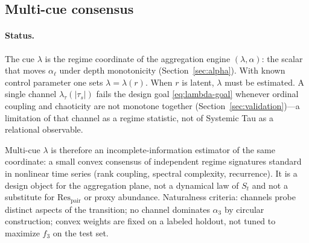 \documentclass[11pt,a4paper]{article}
\begin{document}
\subsection{Multi-cue consensus}

\paragraph{Status.}
The cue $\lambda$ is the regime coordinate of the aggregation engine
$(\lambda,\alpha)$: the scalar that moves $\alpha_\ell$ under depth
monotonicity (Section~\ref{sec:alpha}). With known control parameter one
sets $\lambda=\lambda(r)$. When $r$ is latent, $\lambda$ must be
estimated. A single channel $\lambda_\tau(|\tau_s|)$ fails the design goal
\eqref{eq:lambda-goal} whenever ordinal coupling and chaoticity are not
monotone together (Section~\ref{sec:validation})---a limitation of that
channel as a regime statistic, not of Systemic Tau as a relational
observable.

Multi-cue $\lambda$ is therefore an incomplete-information estimator of
the same coordinate: a small convex consensus of independent regime
signatures standard in nonlinear time series (rank coupling, spectral
complexity, recurrence). It is a design object for the aggregation plane,
not a dynamical law of $S_t$ and not a substitute for
$\mathrm{Res}_{\mathrm{pair}}$ or proxy abundance. Naturalness criteria:
channels probe distinct aspects of the transition; no channel dominates
$\alpha_3$ by circular construction; convex weights are fixed on a
labeled holdout, not tuned to maximize $f_3$ on the test set.
\end{document}
